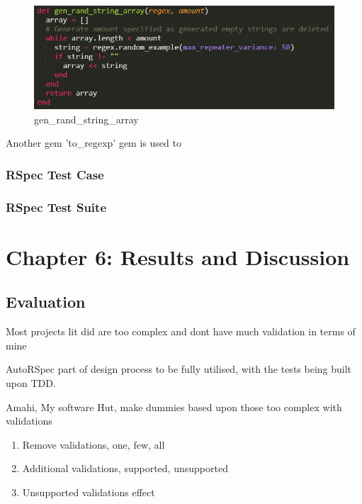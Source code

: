 \documentclass[a4paper,12pt]{article}
\begin{document}
\begin{figure}
\includegraphics[width=\linewidth]{screenshots/genranstr}
\caption{gen\_rand\_string\_array}
\label{fig:genranstr}
\end{figure}
\par Another gem 'to\_regexp' gem\cite{regexpstrgem} is used to 
\subsubsection{RSpec Test Case}


\subsubsection{RSpec Test Suite}



\section{Chapter 6: Results and Discussion}

\subsection{Evaluation}
\par Most projects lit did are too complex and dont have much validation in terms of mine

\par AutoRSpec part of design process to be fully utilised, with the tests being built upon TDD. 

\par Amahi, My software Hut, make dummies based upon those too complex with validations

\begin{enumerate}
\item Remove validations, one, few, all
\item Additional validations, supported, unsupported
\item Unsupported validations effect
\end{enumerate}
\end{document}
